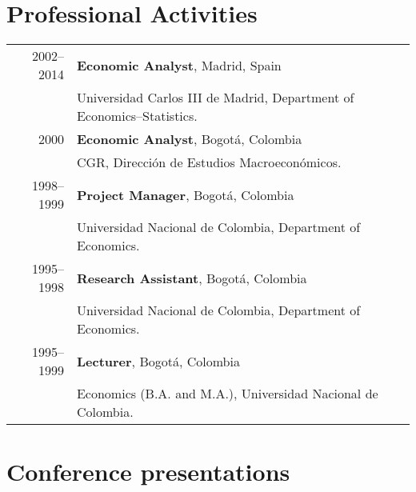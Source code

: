 \documentclass[11pt]{article}\usepackage[]{graphicx}\usepackage[]{color}
\begin{document}

\section{Professional Activities} 

\begin{tabular}{rl{-2cm}}

2002--2014 &  \textbf{Economic Analyst}, Madrid, Spain\\
\vspace{5pt}& Universidad Carlos III de Madrid, Department of Economics--Statistics.\\

2000 & \textbf{Economic Analyst}, Bogotá, Colombia\\
\vspace{5pt}& CGR, Dirección de Estudios Macroeconómicos.\\

1998--1999 & \textbf{Project Manager}, Bogotá, Colombia\\
\vspace{5pt}& Universidad Nacional de Colombia, Department of Economics.\\

1995--1998 & \textbf{Research Assistant}, Bogotá, Colombia\\
\vspace{5pt}& Universidad Nacional de Colombia, Department of Economics.}\\

1995--1999 & \textbf{Lecturer}, Bogotá, Colombia\\
\vspace{5pt}& Economics (B.A. and M.A.), Universidad Nacional de Colombia.\\

\end{tabular}
\vspace{10pt}



\section{Conference presentations} 
\end{document}
